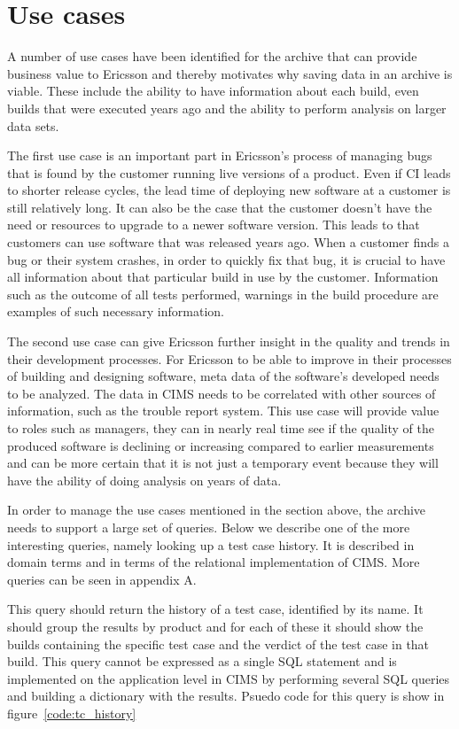 \section{Use cases}
\label{sec:usecases}
A number of use cases have been identified for the archive that can provide business value to Ericsson and thereby motivates why saving data in an archive is viable. These include the ability to have information about each build, even builds that were executed years ago and the ability to perform analysis on larger data sets. 

The first use case is an important part in Ericsson's process of managing bugs that is found by the customer running live versions of a product. Even if CI leads to shorter release cycles, the lead time of deploying new software at a customer is still relatively long. It can also be the case that the customer doesn't have the need or resources to upgrade to a newer software version. This leads to that customers can use software that was released years ago. When a customer finds a bug or their system crashes, in order to quickly fix that bug, it is crucial to have all information about that particular build in use by the customer. Information such as the outcome of all tests performed, warnings in the build procedure are examples of such necessary information. 

The second use case can give Ericsson further insight in the quality and trends in their development processes. For Ericsson to be able to improve in their processes of building and designing software, meta data of the software's developed needs to be analyzed. The data in CIMS needs to be correlated with other sources of information, such as the trouble report system. This use case will provide value to roles such as managers, they can in nearly real time see if the quality of the produced software is declining or increasing compared to earlier measurements and can be more certain that it is not just a temporary event because they will have the ability of doing analysis on years of data. 


In order to manage the use cases mentioned in the section above, the archive needs to support a large set of queries. Below we describe one of the more interesting queries, namely looking up a test case history. It is described in domain terms and in terms of the relational implementation of CIMS. More queries can be seen in appendix A.


\label{q:tchistory}
This query should return the history of a test case, identified by its name. It should group the results by product and for each of these it should show the builds containing the specific test case and the verdict of the test case in that build. This query cannot be expressed as a single SQL statement and is implemented on the application level in CIMS by performing several SQL queries and building a dictionary with the results. Psuedo code for this query is show in figure~\ref{code:tc_history}


